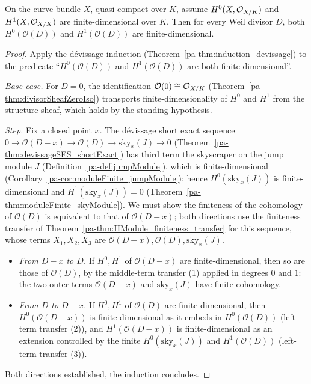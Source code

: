 \begin{theorem}
  \label{pa-thm:moduleFinite_divisorSheaf}
  \leanok

  On the curve bundle \(X\), quasi-compact over \(K\), assume \(H^0(X, \mathcal{O}_{X/K})\) and
  \(H^1(X, \mathcal{O}_{X/K})\) are finite-dimensional over \(K\). Then for every Weil divisor \(D\),
  both \(H^0(\mathcal O(D))\) and \(H^1(\mathcal O(D))\) are finite-dimensional.
\end{theorem}
\begin{proof}
  \leanok
  Apply the dévissage induction (Theorem~\ref{pa-thm:induction_devissage}) to the predicate
  ``\(H^0(\mathcal O(D))\) and \(H^1(\mathcal O(D))\) are both finite-dimensional''.

  \emph{Base case.} For \(D = 0\), the identification \(\mathcal O(0) \cong \mathcal{O}_{X/K}\)
  (Theorem~\ref{pa-thm:divisorSheafZeroIso}) transports finite-dimensionality of \(H^0\) and \(H^1\)
  from the structure sheaf, which holds by the standing hypothesis.

  \emph{Step.} Fix a closed point \(x\). The dévissage short exact sequence
  \(0 \to \mathcal O(D-x) \to \mathcal O(D) \to \mathrm{sky}_x(J) \to 0\)
  (Theorem~\ref{pa-thm:devissageSES_shortExact}) has third term the skyscraper on the jump module
  \(J\) (Definition~\ref{pa-def:jumpModule}), which is finite-dimensional
  (Corollary~\ref{pa-cor:moduleFinite_jumpModule}); hence \(H^0(\mathrm{sky}_x(J))\) is
  finite-dimensional and \(H^1(\mathrm{sky}_x(J)) = 0\)
  (Theorem~\ref{pa-thm:moduleFinite_skyModule}). We must show the finiteness of the cohomology of
  \(\mathcal O(D)\) is equivalent to that of \(\mathcal O(D-x)\); both directions use the
  finiteness transfer of Theorem~\ref{pa-thm:HModule_finiteness_transfer} for this sequence, whose
  terms \(X_1, X_2, X_3\) are \(\mathcal O(D-x), \mathcal O(D), \mathrm{sky}_x(J)\).
  \begin{itemize}
    \item \emph{From \(D-x\) to \(D\).} If \(H^0, H^1\) of \(\mathcal O(D-x)\) are
      finite-dimensional, then so are those of \(\mathcal O(D)\), by the middle-term transfer
      (1) applied in degrees \(0\) and \(1\): the two outer terms \(\mathcal O(D-x)\) and
      \(\mathrm{sky}_x(J)\) have finite cohomology.
    \item \emph{From \(D\) to \(D-x\).} If \(H^0, H^1\) of \(\mathcal O(D)\) are
      finite-dimensional, then \(H^0(\mathcal O(D-x))\) is finite-dimensional as it embeds in
      \(H^0(\mathcal O(D))\) (left-term transfer (2)), and \(H^1(\mathcal O(D-x))\) is
      finite-dimensional as an extension controlled by the finite \(H^0(\mathrm{sky}_x(J))\) and
      \(H^1(\mathcal O(D))\) (left-term transfer (3)).
  \end{itemize}
  Both directions established, the induction concludes.
\end{proof}

